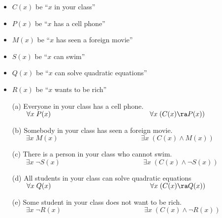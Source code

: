 \begin{questions}
\begin{minipage}{0.5\textwidth}
\begin{itemize}[itemsep=0pt,parsep=0pt,topsep=0pt,partopsep=0pt]
  \item $C(x)$ be ``$x$ in your class''
  \item $P(x)$ be ``$x$ has a cell phone''
  \item $M(x)$ be ``$x$ has seen a foreign movie''
\end{itemize}
\end{minipage}
\begin{minipage}{0.5\textwidth}
\begin{itemize}[itemsep=0pt,parsep=0pt,topsep=0pt,partopsep=0pt]
  \item $S(x)$ be ``$x$ can swim''
  \item $Q(x)$ be ``$x$ can solve quadratic equations''
  \item $R(x)$ be ``$x$ wants to be rich''
\end{itemize}
\end{minipage}
  \begin{solution}
    \begin{itemize}[itemsep=0pt,parsep=0pt,topsep=0pt,partopsep=0pt]
        \item[(a)] Everyone in your class has a cell phone.\\
        $\qquad \forall x\; P(x) \hspace{2in} \forall x\; (C(x) \ra P(x))$
       \item[(b)] Somebody in your class has seen a foreign movie. \\
       $\qquad \exists x\; M(x) \hspace{2in} \exists x\; (C(x) \wedge M(x))$
       \item[(c)] There is a person in your class who cannot swim. \\
       $\qquad \exists x\; \neg S(x) \hspace{2in} \exists x\; (C(x) \wedge \neg S(x))$
       \item[(d)] All students in your class can solve quadratic equations \\
        $\qquad \forall x\; Q(x) \hspace{2in} \forall x\; (C(x) \ra Q(x))$       
       \item[(e)] Some student in your class does not want to be rich. \\
        $\qquad \exists x\; \neg R(x) \hspace{2in} \exists x\; (C(x) \wedge \neg R(x))$
    \end{itemize}


\end{solution}
\end{questions}

